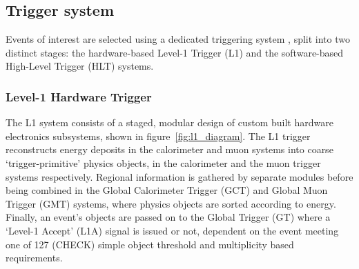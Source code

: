 \subsection{Trigger system}
Events of interest are selected using a dedicated triggering system \cite{tridasTDR},
split into two distinct stages: the hardware-based Level-1 Trigger (L1) and
the software-based High-Level Trigger (HLT) systems.

\subsubsection{Level-1 Hardware Trigger}

The L1 system consists of a staged, modular design of custom built hardware 
electronics subsystems, shown in figure~\ref{fig:l1_diagram}. 
The L1 trigger reconstructs energy deposits in the calorimeter and muon systems
into coarse `trigger-primitive' physics objects, in the calorimeter and the muon 
trigger systems respectively. Regional information is gathered by separate modules 
before being combined in the Global Calorimeter Trigger (GCT) and Global Muon 
Trigger (GMT) systems, where physics objects are sorted according to energy. 
Finally, an event's objects are passed on to the Global Trigger (GT) where a 
`Level-1 Accept' (L1A) signal is issued or not, dependent on the event meeting 
one of 127 (CHECK) simple object threshold and multiplicity based requirements.

